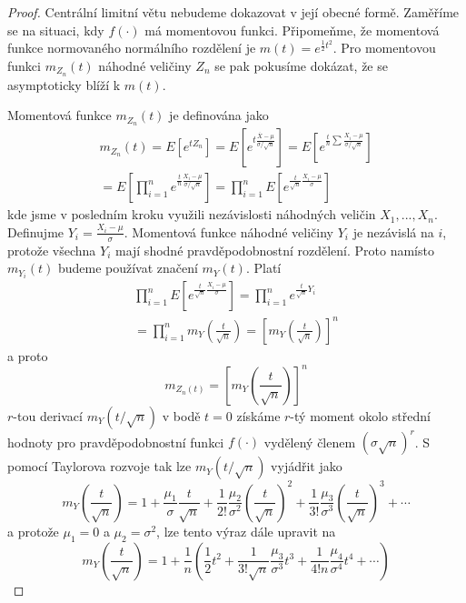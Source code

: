 \begin{proof}
Centrální limitní větu nebudeme dokazovat v její obecné formě. Zaměříme se na situaci, kdy $f(\cdot)$ má momentovou funkci. Připomeňme, že momentová funkce normovaného normálního rozdělení je $m(t) = e^{\frac{1}{2}t^2}$. Pro momentovou funkci $m_{Z_n}(t)$ náhodné veličiny $Z_n$ se pak pokusíme dokázat, že se asymptoticky blíží k $m(t)$. 

Momentová funkce $m_{Z_n}(t)$ je definována jako
\begin{gather*}
m_{Z_n}(t) = E[e^{tZ_n}] = E\left[e^{t\frac{\overline{X} - \mu}{\sigma / \sqrt{n}}} \right] = E\left[e^{\frac{t}{n}\sum \frac{X_i - \mu}{\sigma / \sqrt{n}}} \right]\\
= E\left[\prod_{i = 1}^n e^{\frac{t}{n} \frac{X_i - \mu}{\sigma / \sqrt{n}}} \right] = \prod_{i = 1}^n E \left[e^{\frac{t}{\sqrt{n}}\frac{X_i - \mu}{\sigma}} \right]
\end{gather*}
kde jsme v posledním kroku využili nezávislosti náhodných veličin $X_1, ..., X_n$. Definujme $Y_i = \frac{X_i - \mu}{\sigma}$. Momentová funkce náhodné veličiny $Y_i$ je nezávislá na $i$, protože všechna $Y_i$ mají shodné pravděpodobnostní rozdělení. Proto namísto $m_{Y_i}(t)$ budeme používat značení $m_Y(t)$. Platí
\begin{gather*}
\prod_{i = 1}^n E \left[e^{\frac{t}{\sqrt{n}} \frac{X_i - \mu}{\sigma}} \right] = \prod_{i = 1}^n e^{\frac{t}{\sqrt{n}} Y_i}\\
= \prod_{i = 1}^n m_Y\left(\frac{t}{\sqrt{n}}\right) = \left[m_Y\left(\frac{t}{\sqrt{n}}\right)\right]^n
\end{gather*}
a proto
\begin{equation*}
m_{Z_n(t)} = \left[m_Y \left(\frac{t}{\sqrt{n}}\right)\right]^n
\end{equation*}
$r$-tou derivací $m_Y(t/\sqrt{n})$ v bodě $t = 0$ získáme $r$-tý moment okolo střední hodnoty pro pravděpodobnostní funkci $f(\cdot)$ vydělený členem $(\sigma \sqrt{n})^r$. S pomocí Taylorova rozvoje tak lze $m_Y(t/\sqrt{n})$ vyjádřit jako
\begin{equation*}
m_Y\left(\frac{t}{\sqrt{n}}\right) = 1 + \frac{\mu_1}{\sigma}\frac{t}{\sqrt{n}}+\frac{1}{2!}\frac{\mu_2}{\sigma^2} \left(\frac{t}{\sqrt{n}}\right)^2 + \frac{1}{3!} \frac{\mu_3}{\sigma^3} \left(\frac{t}{\sqrt{n}}\right)^3 + \cdots
\end{equation*}
a protože $\mu_1 = 0$ a $\mu_2 = \sigma^2$, lze tento výraz dále upravit na
\begin{equation*}
m_Y\left(\frac{t}{\sqrt{n}}\right) = 1 + \frac{1}{n}\left(\frac{1}{2}t^2 + \frac{1}{3! \sqrt{n}}\frac{\mu_3}{\sigma^3} t^3 + \frac{1}{4!n}\frac{\mu_4}{\sigma^4}t^4 + \cdots \right)

\end{equation*}
\end{proof}
